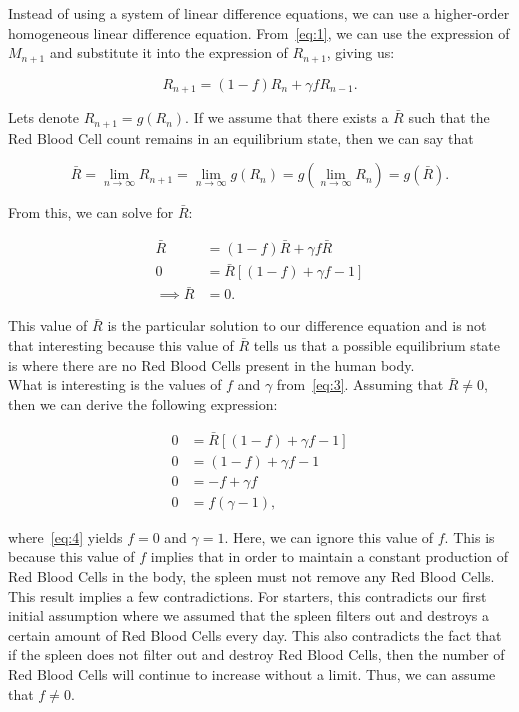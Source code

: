 Instead of using a system of linear difference equations, we can use a higher-order homogeneous linear difference equation. From~\eqref{eq:1}, we can use the expression of $M_{n+1}$ and substitute it into the expression of $R_{n+1}$, giving us:

\begin{equation}\label{eq:2}
    R_{n+1} =  (1-f)R_n + \gamma fR_{n-1}.
\end{equation}

Lets denote $R_{n+1} = g(R_n)$.
If we assume that there exists a $\bar{R}$ such that the Red Blood Cell count remains in an equilibrium state, then we can say that

\[
\bar{R} = \lim_{n\to\infty} R_{n+1} = \lim_{n\to\infty} g(R_n) = g\left(\lim_{n\to\infty} R_n\right) = g(\bar{R}).
\]

From this, we can solve for $\bar{R}$:

\begin{align}
    \bar{R} &= (1-f)\bar{R} + \gamma f\bar{R} \nonumber\\
    0 &= \bar{R}[(1-f) + \gamma f - 1] \label{eq:3} \\ 
    \implies \bar{R} &= 0. \nonumber
\end{align}

This value of $\bar{R}$ is the particular solution to our difference equation and is not that interesting because this value of $\bar{R}$ tells us that a possible equilibrium state is where there are no Red Blood Cells present in the human body. \\

What is interesting is the values of $f$ and $\gamma$ from~\eqref{eq:3}. Assuming that $\bar{R} \neq 0$, then we can derive the following expression:

\begin{align} 
    0 &= \bar{R}[(1-f) + \gamma f - 1] \nonumber\\
    0 &= (1-f) + \gamma f - 1 \nonumber\\
    0 &= -f + \gamma f \nonumber\\
    0 &= f(\gamma - 1), \label{eq:4}
\end{align}

where~\eqref{eq:4} yields $f=0$ and $\gamma=1$. Here, we can ignore this value of $f$. This is because this value of $f$ implies that in order to maintain a constant production of Red Blood Cells in the body, the spleen must not remove any Red Blood Cells. This result implies a few contradictions. For starters, this contradicts our first initial assumption where we assumed that the spleen filters out and destroys a certain amount of Red Blood Cells every day. This also contradicts the fact that if the spleen does not filter out and destroy Red Blood Cells, then the number of Red Blood Cells will continue to increase without a limit. Thus, we can assume that $f\neq0$.\\

